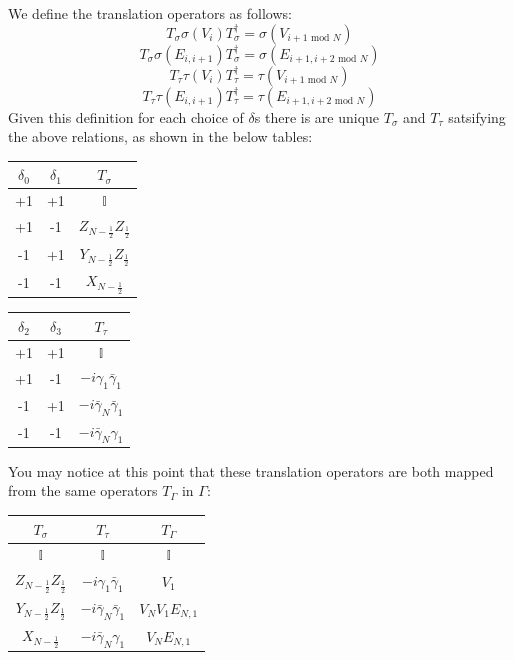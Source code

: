 \documentclass{article}
\begin{document}
We define the translation operators as follows:
\begin{equation}
\label{eq:1}
    T_{\sigma} \sigma(V_i)T^{\dagger}_{\sigma} = \sigma(V_{i+1 \text{ mod }N})
\end{equation}
\begin{equation}\label{eq:2}
    T_{\sigma} \sigma(E_{i,i+1})T^{\dagger}_{\sigma} = \sigma(E_{i+1,i+2 \text{ mod }N})
\end{equation}
\begin{equation}
\label{eq:3}
    T_{\tau} \tau(V_i)T^{\dagger}_{\tau} = \tau(V_{i+1 \text{ mod }N})
\end{equation}
\begin{equation}
\label{eq:4}
    T_{\tau} \tau(E_{i,i+1})T^{\dagger}_{\tau} = \tau(E_{i+1,i+2 \text{ mod }N})
\end{equation}
Given this definition for each choice of $\delta$s there is are unique $T_{\sigma}$ and $T_{\tau}$ satsifying the above relations, as shown in the below tables:
\begin{table}[htbp]
    \centering
    \begin{tabular}{|c|c|c|}\hline
        $\delta_0$ & $\delta_1$ & $T_{\sigma}$\\ \hline
         +1& +1& $\mathbb{I}$\\ 
         +1& -1& $Z_{N-\frac{1}{2}}Z_{\frac{1}{2}}$\\ 
         -1& +1& $Y_{N-\frac{1}{2}}Z_{\frac{1}{2}}$\\ 
         -1& -1& $X_{N-\frac{1}{2}}$\\ \hline
    \end{tabular}
    \begin{tabular}{|c|c|c|}\hline
        $\delta_2$ & $\delta_3$ & $T_{\tau}$\\ \hline
         +1& +1& $\mathbb{I}$\\ 
         +1& -1& $-i\gamma_1\bar{\gamma}_1$\\ 
         -1& +1& $-i \bar{\gamma}_N \bar{\gamma}_1$\\ 
         -1& -1& $-i \bar{\gamma}_N \gamma_1$\\ \hline
    \end{tabular}
\end{table}

You may notice at this point that these translation operators are both mapped from the same operators $T_{\Gamma}$ in $\Gamma$:

{
    \centering
    \begin{tabular}{|c|c|c|}\hline
        $T_{\sigma}$ & $T_{\tau}$ & $T_{\Gamma}$\\ \hline
         $\mathbb{I}$& $\mathbb{I}$& $\mathbb{I}$\\ 
         $Z_{N-\frac{1}{2}}Z_{\frac{1}{2}}$& $-i\gamma_1\bar{\gamma}_1$& $V_1$\\ 
         $Y_{N-\frac{1}{2}}Z_{\frac{1}{2}}$& $-i \bar{\gamma}_N \bar{\gamma}_1$& $V_NV_1E_{N,1}$\\ 
         $X_{N-\frac{1}{2}}$& $-i \bar{\gamma}_N \gamma_1$& $V_NE_{N,1}$ \\ \hline
    \end{tabular}
}
\end{document}

